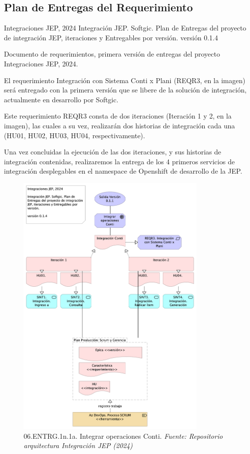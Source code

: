 \documentclass[
  paper=a4,
  ,captions=tableheading
]{scrartcl}
\renewenvironment{quote}{\begin{customblockquote}\list{}{\rightmargin=0em\leftmargin=0em}%
\item\relax\color{blockquote-text}\ignorespaces}{\unskip\unskip\endlist\end{customblockquote}}
\begin{document}
\subsection{Plan de Entregas del
Requerimiento}\label{sec:plan-de-entregas-del-requerimiento}

\begin{quote}
Integraciones JEP, 2024 Integración JEP. Softgic. Plan de Entregas del
proyecto de integración JEP, iteraciones y Entregables por versión.
versión 0.1.4
\end{quote}

Documento de requerimientos, primera versión de entregas del proyecto
Integraciones JEP, 2024.

El requerimiento Integración con Sistema Conti x Plani (REQR3, en la
imagen) será entregado con la primera versión que se libere de la
solución de integración, actualmente en desarrollo por Softgic.

Este requerimiento REQR3 consta de dos iteraciones (Iteración 1 y 2, en
la imagen), las cuales a su vez, realizarán dos historias de integración
cada una (HU01, HU02, HU03, HU04, respectivamente).

Una vez concluidas la ejecución de las dos iteraciones, y sus historias
de integración contenidas, realizaremos la entrega de los 4 primeros
servicios de integración desplegables en el namespace de Openshift de
desarrollo de la JEP.

\begin{figure}
\centering
\includegraphics[width=\textwidth,height=5.20833in]{images/06.ENTRG.1n.1a.IntegraroperacionesConti.png}
\caption{06.ENTRG.1n.1a. Integrar operaciones Conti. \emph{Fuente:
Repositorio arquitectura Integración JEP
(2024)}}\label{fig:id-c31668d4d5dd44309f42fdd5fb2a7a53}
\end{figure}
\end{document}
